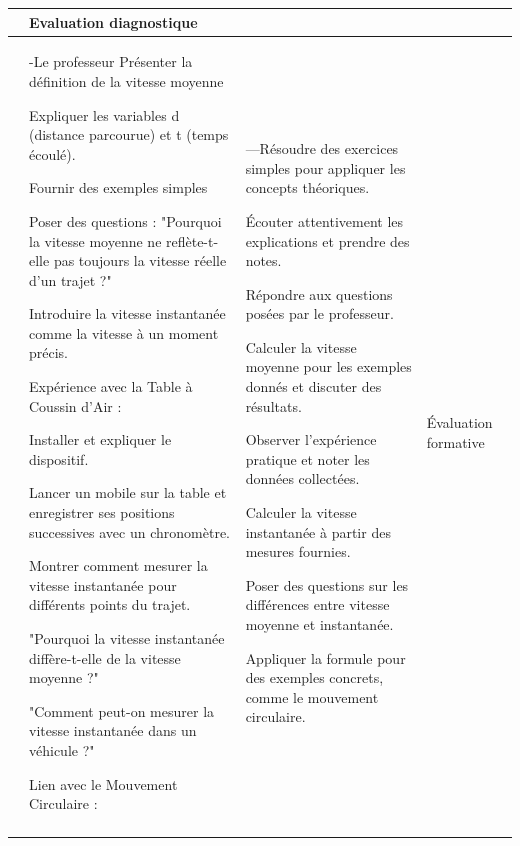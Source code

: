 \documentclass[14pt]{article}
\begin{document}
\begin{center}
\begin{tabular}{|p{}||p{}||p{}||p{}|}
				  &
				  Evaluation
diagnostique\\\hline


\color{red}{II  La vitesse}


				  &
-Le professeur 
Présenter la définition de la vitesse moyenne

Expliquer les variables 
d (distance parcourue) et 
t (temps écoulé).

Fournir des exemples simples

Poser des questions :
"Pourquoi la vitesse moyenne ne reflète-t-elle pas toujours la vitesse réelle d’un trajet ?"

Introduire la vitesse instantanée comme la vitesse à un moment précis.

Expérience avec la Table à Coussin d’Air :

Installer et expliquer le dispositif.

Lancer un mobile sur la table et enregistrer ses positions successives avec un chronomètre.

Montrer comment mesurer la vitesse instantanée pour différents points du trajet.

"Pourquoi la vitesse instantanée diffère-t-elle de la vitesse moyenne ?"

"Comment peut-on mesurer la vitesse instantanée dans un véhicule ?"

Lien avec le Mouvement Circulaire :

				  &
				  ---Résoudre des exercices simples pour appliquer les concepts théoriques. 

          Écouter attentivement les explications et prendre des notes.

Répondre aux questions posées par le professeur.

Calculer la vitesse moyenne pour les exemples donnés et discuter des résultats.

Observer l’expérience pratique et noter les données collectées.

Calculer la vitesse instantanée à partir des mesures fournies.

Poser des questions sur les différences entre vitesse moyenne et instantanée.

Appliquer la formule pour des exemples concrets, comme le mouvement circulaire.


				  & 
	Évaluation formative			  
  \\\hline

\color{red}{III  Le mouvement rectiligne uniforme : }


\end{tabular}
\end{center}
\end{document}
